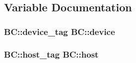 \subsection{Variable Documentation}
\subsubsection[{\texorpdfstring{device}{device}}]{\setlength{\rightskip}{0pt plus 5cm} {\bf B\+C\+::device\+\_\+tag}  B\+C\+::device}\hypertarget{namespaceBC_a7e470be15628f2bc146897a23005c9b9}{}\label{namespaceBC_a7e470be15628f2bc146897a23005c9b9}
\subsubsection[{\texorpdfstring{host}{host}}]{\setlength{\rightskip}{0pt plus 5cm} {\bf B\+C\+::host\+\_\+tag}  B\+C\+::host}\hypertarget{namespaceBC_a6a08f6f3615e3b1abd0460c74c899536}{}\label{namespaceBC_a6a08f6f3615e3b1abd0460c74c899536}
